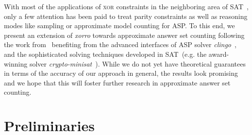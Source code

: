 \documentclass{svproc}
\newcommand{\XOR}{\textsc{xor}} %
\newcommand{\sysfont}{\textit}
\newcommand{\clingo}{\sysfont{clingo}}
\newcommand{\xorro}{\sysfont{xorro}}
\newcommand{\cryptominisat}{\sysfont{crypto-minisat}}
\begin{document}
%
With most of the applications of \XOR{} constraints in the neighboring area of SAT~\cite{DBLP:journals/corr/abs-1806-02239},
only a few attention has been paid to treat parity constraints as well as reasoning modes like sampling or approximate model counting for ASP. %
%
To this end, we present an extension of \xorro{} towards approximate answer set counting following the work from~\cite{ChakrabortyMV13}
benefiting from the advanced interfaces of ASP solver \clingo{}~\cite{DBLP:conf/iclp/GebserKKOSW16},
and the sophisticated solving techniques developed in SAT~(e.g. the award-winning solver \cryptominisat~\cite{DBLP:conf/sat/SoosNC09}).
%
While we do not yet have theoretical guarantees in terms of the accuracy of our approach in general,
the results look promising and we hope that this will foster further research in approximate answer set counting.
%

\section{Preliminaries}
\end{document}
